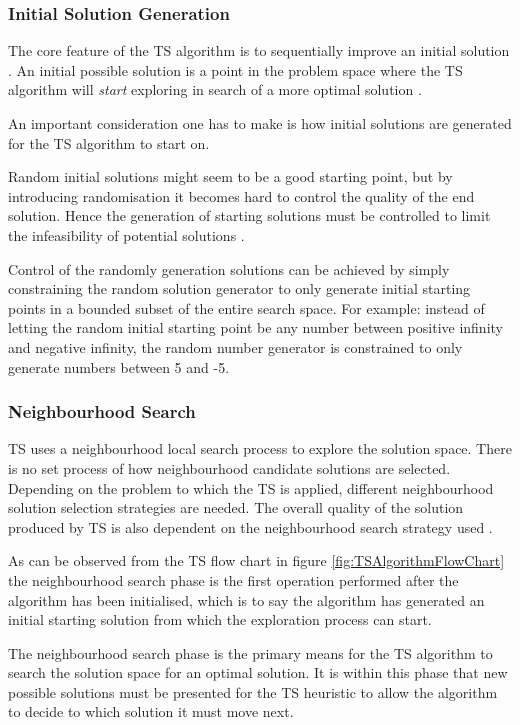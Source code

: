 \subsubsection{Initial Solution Generation}
The core feature of the TS algorithm is to sequentially improve an initial solution \cite{TSHazardous}. An initial possible solution is a point in the problem space where the TS algorithm will \emph{start} exploring in search of a more optimal solution \cite{AIModernApproach,TSHazardous}.

An important consideration one has to make is how initial solutions are generated for the TS algorithm to start on\cite{AIModernApproach,TSHazardous}.

Random initial solutions might seem to be a good starting point, but by introducing randomisation it becomes hard to control the quality of the end solution\cite{TSHazardous}. Hence the generation of starting solutions must be controlled to limit the infeasibility of potential solutions \cite{TSHazardous}. 

Control of the randomly generation solutions can be achieved by simply constraining the random solution generator to only generate initial starting points in a bounded subset of the entire search space. For example: instead of letting the random initial starting point be any number between positive infinity and negative infinity, the random number generator is constrained to only generate numbers between 5 and -5.

\subsubsection{Neighbourhood Search}
TS uses a neighbourhood local search process to explore the solution space. There is no set process of how neighbourhood candidate solutions are selected. Depending on the problem to which the TS is applied, different neighbourhood solution selection strategies are needed. The overall quality of the solution produced by TS is also dependent on the neighbourhood search strategy used \cite{TSHazardous}. 

As can be observed from the TS flow chart in figure \ref{fig:TSAlgorithmFlowChart} the neighbourhood search phase is the first operation performed after the algorithm has been initialised, which is to say the algorithm has generated an initial starting solution from which the exploration process can start.

The neighbourhood search phase is the primary means for the TS algorithm to search the solution space for an optimal solution. It is within this phase that new possible solutions must be presented for the TS heuristic to allow the algorithm to decide to which solution it must move next.

